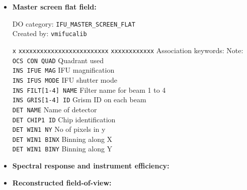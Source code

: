 \begin{itemize}

\item {\bf Master screen flat field:}

DO category: {\tt IFU\_MASTER\_SCREEN\_FLAT} \\
Created by: {\tt vmifucalib}

\begin{tabbing}
{\tt x} \= {\tt xxxxxxxxxxxxxxxxxxxxxxxxx} \= {\tt xxxxxxxxxxxx} \kill
\> Association keywords: \> Note: \\
\> {\tt OCS CON QUAD} \> Quadrant used \\
\> {\tt INS IFUE MAG} \> IFU magnification \\
\> {\tt INS IFUS MODE} \> IFU shutter mode \\
\> {\tt INS FILT[1-4] NAME} \> Filter name for beam 1 to 4 \\
\> {\tt INS GRIS[1-4] ID} \> Grism ID on each beam \\
\> {\tt DET NAME} \> Name of detector \\
\> {\tt DET CHIP1 ID} \> Chip identification \\
\> {\tt DET WIN1 NY} \> No of pixels in y \\
\> {\tt DET WIN1 BINX} \> Binning along X \\
\> {\tt DET WIN1 BINY} \> Binning along Y \\
\end{tabbing}

\item {\bf Spectral response and instrument efficiency:}


\item {\bf Reconstructed field-of-view:}


\end{itemize}
